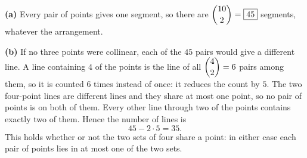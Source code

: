 \textbf{(a)} Every pair of points gives one segment, so there are $\dbinom{10}{2}=\boxed{45}$ segments, whatever the arrangement.

\textbf{(b)} If no three points were collinear, each of the $45$ pairs would give a different line. A line containing $4$ of the points is the line of all $\dbinom42=6$ pairs among them, so it is counted $6$ times instead of once: it reduces the count by $5$. The two four-point lines are different lines and they share at most one point, so no pair of points is on both of them. Every other line through two of the points contains exactly two of them. Hence the number of lines is
\[
45-2\cdot5=\boxed{35}.
\]
This holds whether or not the two sets of four share a point: in either case each pair of points lies in at most one of the two sets.
